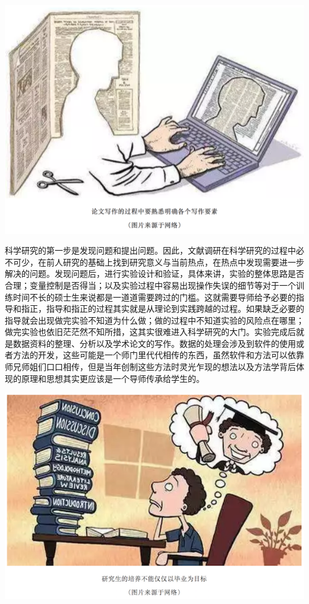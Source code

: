\documentclass[
]{book}
\begin{document}
\includegraphics[width=8.33in]{images/edit2}

科学研究的第一步是发现问题和提出问题。因此，文献调研在科学研究的过程中必不可少，在前人研究的基础上找到研究意义与当前热点，在热点中发现需要进一步解决的问题。发现问题后，进行实验设计和验证，具体来讲，实验的整体思路是否合理；变量控制是否得当；以及实验过程中容易出现操作失误的细节等对于一个训练时间不长的硕士生来说都是一道道需要跨过的门槛。这就需要导师给予必要的指导和指正，指导和指正的过程其实就是从理论到实践跨越的过程。如果缺乏必要的指导就会出现做完实验不知道为什么做；做的过程中不知道实验的风险点在哪里；做完实验也依旧茫茫然不知所措，这其实很难进入科学研究的大门。实验完成后就是数据资料的整理、分析以及学术论文的写作。数据的处理会涉及到软件的使用或者方法的开发，这些可能是一个师门里代代相传的东西，虽然软件和方法可以依靠师兄师姐们口口相传，但是当年创制这些方法时灵光乍现的想法以及方法学背后体现的原理和思想其实更应该是一个导师传承给学生的。

\includegraphics[width=8.33in]{images/edit3}
\end{document}
